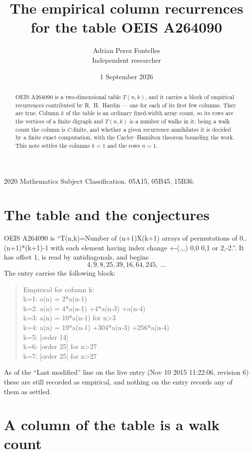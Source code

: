 \documentclass[11pt,a4paper]{article}
\title{The empirical column recurrences for the table OEIS A264090}
\author{Adrian Perez Fontelles\\ \small Independent researcher}
\date{1 September 2026}
\theoremstyle{plain}
\theoremstyle{definition}
\begin{document}
\maketitle

\begin{abstract}
OEIS A264090 is a two-dimensional table $T(n,k)$, and it carries a block of empirical
recurrences contributed by R.~H.~Hardin --- one for each of its first few columns. They are
true. Column $k$ of the table is an ordinary fixed-width array count, so its rows are the
vertices of a finite digraph and $T(n,k)$ is a number of walks in it; being a walk count the
column is $C$-finite, and whether a given recurrence annihilates it is decided by a finite
exact computation, with the Cayley--Hamilton theorem bounding the work. This note settles the columns $k=1$ and the rows $n=1$.
\end{abstract}

\noindent\small 2020 Mathematics Subject Classification. 05A15, 05B45, 15B36.\normalsize

\section{The table and the conjectures}

OEIS A264090 is ``T(n,k)=Number of (n+1)X(k+1) arrays of permutations of 0..(n+1)*(k+1)-1 with each element having index change +-(.,.) 0,0 0,1 or 2,-2.''. It has offset $1$, is
read by antidiagonals, and begins
\[
4, 9, 8, 25, 39, 16, 64, 245,\ \dots
\]
The entry carries the following block:
\begin{quote}\small
Empirical for column k:\\
k=1: a(n) = 2*a(n-1)\\
k=2: a(n) = 4*a(n-1) +4*a(n-3) +a(n-4)\\
k=3: a(n) = 10*a(n-1) for n>3\\
k=4: a(n) = 19*a(n-1) +304*a(n-3) +256*a(n-4)\\
k=5: [order 14]\\
k=6: [order 25] for n>27\\
k=7: [order 25] for n>27\\
\end{quote}
As of the ``Last modified'' line on the live entry (Nov 10 2015 11:22:06, revision 6) these are still
recorded as empirical, and nothing on the entry records any of them as settled.

\section{A column of the table is a walk count}
\end{document}
